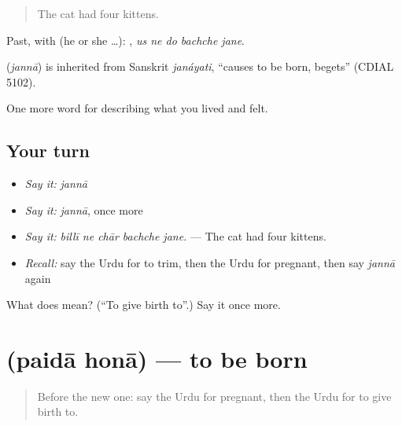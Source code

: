 \begin{quote}
The cat had four kittens.
\end{quote}

Past, with  (he or she …):     , \emph{us ne do bachche jane}.

\begin{cousinweb}
\textbf{} (\emph{jannā}) is inherited from Sanskrit \emph{janáyati}, \textquotedblleft{}causes to be born, begets\textquotedblright{} (CDIAL 5102).
\end{cousinweb}

\begin{grammarlens}[title={What you've built}]
One more word for describing what you lived and felt.
\end{grammarlens}

\subsection*{Your turn}
\begin{itemize}
\raggedright
  \item \emph{Say it:} \emph{jannā}
  \item \emph{Say it:} \emph{jannā}, once more
  \item \emph{Say it:} \emph{billī ne chār bachche jane.} — The cat had four kittens.
  \item \emph{Recall:} say the Urdu for to trim, then the Urdu for pregnant, then say \emph{jannā} again
\end{itemize}

\begin{tcolorbox}[breakable,colback=teal!4,colframe=teal!35!black,title={Before you move on}]
What does  mean? (\textquotedblleft{}To give birth to\textquotedblright{}.) Say it once more.
\end{tcolorbox}
\section[\texorpdfstring{\ur{پیدا} \ur{ہونا} (paidā honā)}{پیدا ہونا (paidā honā)}]{  (paidā honā) — to be born}

\label{lesson:UR-C483-paida-hona}



\begin{quote}
Before the new one: say the Urdu for pregnant, then the Urdu for to give birth to.
\end{quote}

